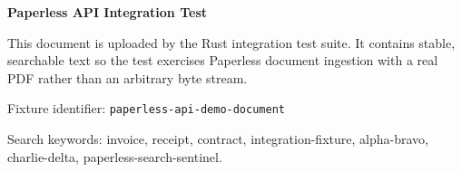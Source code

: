 \documentclass[11pt]{article}
\begin{document}
{\LARGE\bfseries Paperless API Integration Test}\par

\vspace{1.5em}

This document is uploaded by the Rust integration test suite. It contains
stable, searchable text so the test exercises Paperless document ingestion
with a real PDF rather than an arbitrary byte stream.

\vspace{1em}

Fixture identifier: \texttt{paperless-api-demo-document}

\vspace{1em}

Search keywords: invoice, receipt, contract, integration-fixture,
alpha-bravo, charlie-delta, paperless-search-sentinel.
\end{document}
